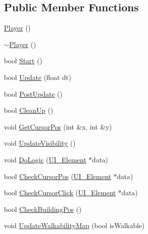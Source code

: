 \subsection*{Public Member Functions}
\begin{DoxyCompactItemize}
\item 
\mbox{\hyperlink{class_player_affe0cc3cb714f6deb4e62f0c0d3f1fd8}{Player}} ()
\item 
\mbox{\hyperlink{class_player_a749d2c00e1fe0f5c2746f7505a58c062}{$\sim$\+Player}} ()
\item 
bool \mbox{\hyperlink{class_player_a797198656a642b66fd8ec656153d8595}{Start}} ()
\item 
bool \mbox{\hyperlink{class_player_a637908f123cba18727999783a7534459}{Update}} (float dt)
\item 
bool \mbox{\hyperlink{class_player_a1defee0e5f5a011305ae00d3a022af18}{Post\+Update}} ()
\item 
bool \mbox{\hyperlink{class_player_aebe8ef704dff5d2b676144c36f4217d8}{Clean\+Up}} ()
\item 
void \mbox{\hyperlink{class_player_a67b4cc05008c0b3ec4c40ce2987698a0}{Get\+Cursor\+Pos}} (int \&x, int \&y)
\item 
void \mbox{\hyperlink{class_player_af46bd7e9f66cbd7c24a1dfb3f7919329}{Update\+Visibility}} ()
\item 
void \mbox{\hyperlink{class_player_ac4b7933fa90258aab8c40e5b5d53fa7e}{Do\+Logic}} (\mbox{\hyperlink{class_u_i___element}{U\+I\+\_\+\+Element}} $\ast$data)
\item 
bool \mbox{\hyperlink{class_player_a9be26181363a215e7a76562a042241ac}{Check\+Cursor\+Pos}} (\mbox{\hyperlink{class_u_i___element}{U\+I\+\_\+\+Element}} $\ast$data)
\item 
bool \mbox{\hyperlink{class_player_a84ce05afd52adb5138c021b100164a66}{Check\+Cursor\+Click}} (\mbox{\hyperlink{class_u_i___element}{U\+I\+\_\+\+Element}} $\ast$data)
\item 
bool \mbox{\hyperlink{class_player_a6879cbd220edf52a79c1c217d2f158e9}{Check\+Building\+Pos}} ()
\item 
void \mbox{\hyperlink{class_player_a9f6646ebdb0ca639bc568922fc8980a3}{Update\+Walkability\+Map}} (bool is\+Walkable)
\end{DoxyCompactItemize}
